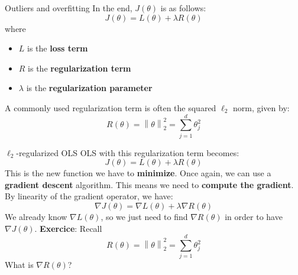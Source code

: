 \documentclass{beamer}
\newcommand{\1}[1]{\mathbbm{1}\left[#1\right]}
\newcommand{\norm}[1]{\left\lVert#1\right\rVert}
\begin{document}
\begin{frame}{Outliers and overfitting}
In the end, $J(\theta)$ is as follows:
\begin{equation*}
J(\theta) = L(\theta) + \lambda R(\theta)
\end{equation*}
where 
\begin{itemize}
	\item $L$ is the \textbf{loss term}
	\item $R$ is the \textbf{regularization term}
	\item $\lambda$ is the \textbf{regularization parameter}
\end{itemize}
\pause
\vfill
A commonly used regularization term is often the squared $\ell_2$ norm, given by:
\begin{equation*}
R(\theta) = \norm{\theta}_2^2 = \sum_{j = 1}^d \theta_j^2
\end{equation*}
\end{frame}

\begin{frame}{$\ell_2$-regularized OLS}
OLS with this regularization term becomes:
\begin{equation*}
J(\theta) = L(\theta) + \lambda R(\theta)
\end{equation*}
\vfill
\pause
This is the new function we have to \textbf{minimize}. Once again, we can use a \textbf{gradient descent} algorithm. This means we need to \textbf{compute the gradient}. By linearity of the gradient operator, we have:
\begin{equation*}
\nabla J(\theta) = \nabla L(\theta) + \lambda \nabla R(\theta)
\end{equation*}
\pause
We already know $\nabla L(\theta)$, so we just need to find $\nabla R(\theta)$ in order to have $\nabla J(\theta)$. 
\vfill
\pause
\textbf{Exercice}: Recall
\begin{equation*}
R(\theta) = \norm{\theta}_2^2 = \sum_{j = 1}^d \theta_j^2
\end{equation*}
What is $\nabla R(\theta)$?
\end{frame}
\end{document}
